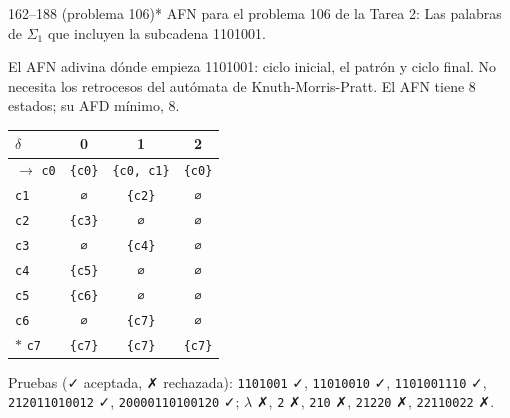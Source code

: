 \documentclass[11pt]{article}
\begin{document}
\begin{ejercicio}{162--188 (problema 106)}{*}
AFN para el problema 106 de la Tarea 2: Las palabras de $\Sigma_1$ que incluyen la subcadena 1101001.
\end{ejercicio}
\proc El AFN adivina dónde empieza 1101001: ciclo inicial, el patrón y ciclo final. No necesita los retrocesos del autómata de Knuth-Morris-Pratt. El AFN tiene 8 estados; su AFD mínimo, 8.
\begin{center}\small\begin{tabular}{lccc}\toprule
$\delta$ & 0 & 1 & 2 \\\midrule
$\to$ \texttt{c0} & \texttt{\{c0\}} & \texttt{\{c0, c1\}} & \texttt{\{c0\}} \\
 \texttt{c1} & \texttt{∅} & \texttt{\{c2\}} & \texttt{∅} \\
 \texttt{c2} & \texttt{\{c3\}} & \texttt{∅} & \texttt{∅} \\
 \texttt{c3} & \texttt{∅} & \texttt{\{c4\}} & \texttt{∅} \\
 \texttt{c4} & \texttt{\{c5\}} & \texttt{∅} & \texttt{∅} \\
 \texttt{c5} & \texttt{\{c6\}} & \texttt{∅} & \texttt{∅} \\
 \texttt{c6} & \texttt{∅} & \texttt{\{c7\}} & \texttt{∅} \\
$*$ \texttt{c7} & \texttt{\{c7\}} & \texttt{\{c7\}} & \texttt{\{c7\}} \\
\bottomrule\end{tabular}\end{center}
Pruebas (✓ aceptada, ✗ rechazada): \texttt{1101001} ✓, \texttt{11010010} ✓, \texttt{1101001110} ✓, \texttt{212011010012} ✓, \texttt{20000110100120} ✓; $\lambda$ ✗, \texttt{2} ✗, \texttt{210} ✗, \texttt{21220} ✗, \texttt{22110022} ✗.
\end{document}
